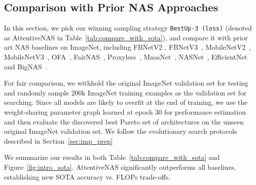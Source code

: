 \documentclass[final]{cvpr}
\theoremstyle{definition}
\begin{document}
\subsection{Comparison with Prior NAS Approaches}
\label{sec:compare_with_sota}
In this section, we pick our winning sampling 
strategy \texttt{BestUp-3 (loss)} (denoted as AttentiveNAS in Table~\ref{tab:compare_with_sota}),  
and compare it with prior art NAS baselines on ImageNet, including
FBNetV2 \cite{wan2020fbnetv2}, FBNetV3~\cite{dai2020fbnetv3}, MobileNetV2~\citep{sandler2018mobilenetv2}, MobileNetV3~\cite{howard2019searching}, OFA~\cite{cai2019once}, FairNAS~\cite{chu2019fairnas}, Proxyless~\cite{cai2018proxylessnas}, MnasNet~\citep{tan2019mnasnet}, NASNet~\citep{zoph2018learning},  EfficientNet~\cite{tan2019efficientnet} and BigNAS~\cite{yu2020bignas}. 


For fair comparison, we withhold the original ImageNet validation set for testing and randomly sample 200k ImageNet training examples as the validation set for searching. 
Since all models are likely to overfit at the end of training, 
we use the weight-sharing parameter graph learned at epoch 30 for performance estimation and then evaluate the discovered best Pareto set of architectures on the
unseen original ImageNet validation set. 
We follow the evolutionary search protocols described in Section~\ref{sec:imp_prep}

We summarize our results in both  Table~\ref{tab:compare_with_sota} and Figure~\ref{fig:intro_sota}. 
AttentiveNAS significantly outperforms all baselines, 
establishing new SOTA accuracy vs. FLOPs trade-offs.  
\end{document}
